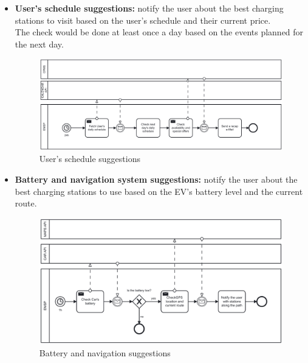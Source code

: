 \documentclass[table, 12pt]{article} %
\begin{document}
        \newpage
        \begin{itemize}                                 
            \item \textbf{User's schedule suggestions:} notify the user about the best charging stations to visit based on the user's schedule and their current price.\\
            The check would be done at least once a day based on the events planned for the next day.
            
            \begin{center}
                \begin{figure}[!h]
                    \includegraphics[scale=0.60, center]{assets/bpmn/suggestion_calendar.png}
                    \caption{User's schedule suggestions}
                    \label{fig: User's schedule suggestions}
                \end{figure}
            \end{center}
        \newpage
            \item \textbf{Battery and navigation system suggestions:} notify the user about the best charging stations to use based on the EV's battery level and the current route.\\            
            \begin{center}
                \begin{figure}[!h]
                    \includegraphics[scale=0.60, center]{assets/bpmn/suggestion_battery_nav.png}
                    \caption{Battery and navigation suggestions}
                    \label{fig: Battery and navigation suggestions}
                \end{figure}
            \end{center}
        \end{itemize}
\end{document}
